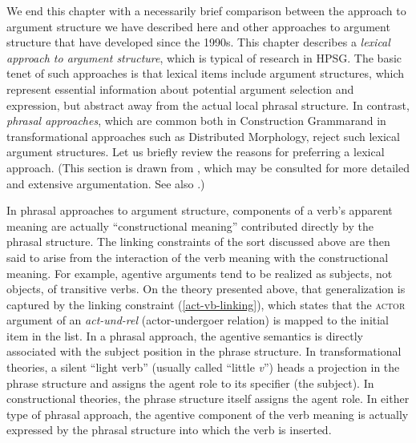 \documentclass[output=paper,biblatex,babelshorthands,newtxmath,draftmode,colorlinks, citecolor=brown]{langscibook}
\begin{document}
We end this chapter with a necessarily brief comparison between the approach to argument structure we have described here and other approaches to argument structure that have developed since the 1990s.
This chapter describes a \textit{lexical approach to argument structure}, which is typical of research in HPSG.  The basic tenet of such approaches is that lexical items include argument structures, which represent essential information about potential argument selection and expression, but
abstract away from the actual local phrasal structure.  In contrast, \emph{phrasal approaches}, which
are common both in Construction Grammar\indexcxg and in transformational approaches such as Distributed Morphology, reject such lexical argument structures.   Let us briefly review the reasons for preferring a lexical approach. (This section is drawn from \citealt{MWArgSt}, which may be consulted for more detailed and extensive argumentation. See also .) 

In phrasal approaches to argument structure, components of a verb's apparent meaning are actually ``constructional meaning'' contributed directly by the phrasal structure.  The linking constraints of the sort discussed above are then said to arise from the interaction of the verb meaning with the constructional meaning.  For example, agentive arguments tend to be realized as subjects, not objects, of transitive verbs.  On the theory presented above, that generalization is captured by the linking constraint (\ref{act-vb-linking}), which states that the \textsc{actor} argument of an \textit{act-und-rel} (actor-undergoer relation) is mapped to the initial item in the \argst list.  In a phrasal approach, the agentive semantics is directly associated with the subject position in the phrase structure.  In transformational theories, a silent ``light verb'' (usually called ``little \textit{v}'') heads a projection in the phrase structure and assigns the agent role to its specifier (the subject).  In constructional theories, the phrase structure itself assigns the agent role.  In either type of phrasal approach, the agentive component of the verb meaning is actually expressed by the phrasal structure into which the verb is inserted.  
\end{document}
